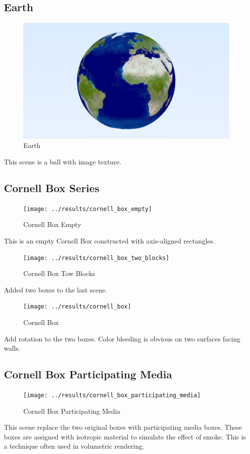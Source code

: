 \documentclass[utf8]{article}
\begin{document}
\subsection{Earth}
\begin{figure}[H]
	\centering
	\includegraphics[width=0.7\linewidth]{../results/earth}
	\caption{Earth}
	\label{fig:earth}
\end{figure}
This scene is a ball with image texture.

\subsection{Cornell Box Series}
\begin{figure}[H]
	\centering
	\texttt{[image: ../results/cornell\_box\_empty]}
	\caption{Cornell Box Empty}
	\label{fig:cornellboxempty}
\end{figure}
This is an empty Cornell Box constructed with axis-aligned rectangles.

\begin{figure}[H]
	\centering
	\texttt{[image: ../results/cornell\_box\_two\_blocks]}
	\caption{Cornell Box Tow Blocks}
	\label{fig:cornellboxtwoblocks}
\end{figure}
\noindent
Added two boxes to the last scene.

\begin{figure}[H]
	\centering
	\texttt{[image: ../results/cornell\_box]}
	\caption{Cornell Box}
	\label{fig:cornellbox}
\end{figure}
\noindent
Add rotation to the two boxes. Color bleeding is obvious on two surfaces facing walls.

\subsection{Cornell Box Participating Media}
\begin{figure}[H]
	\centering
	\texttt{[image: ../results/cornell\_box\_participating\_media]}
	\caption{Cornell Box Participating Media}
	\label{fig:cornellboxparticipatingmedia}
\end{figure}
This scene replace the two original boxes with participating media boxes. These boxes are assigned with isotropic material to simulate the effect of smoke. This is a technique often used in volumetric rendering. 
\end{document}
